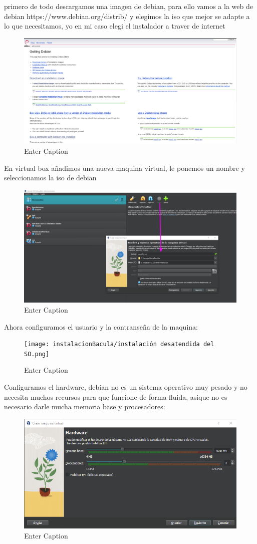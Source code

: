 primero de todo descargamos una imagen de debian, para ello vamos a la web de debian https://www.debian.org/distrib/ y elegimos la iso que mejor se adapte a lo que necesitamos, yo en mi caso elegi el instalador a traver de internet
\begin{figure}[H]
    \centering
    \includegraphics[width=0.5\linewidth]{instalacionBacula/debianPaginaWeb.png}
    \caption{Enter Caption}
\end{figure}
En virtual box añadimos una nueva maquina virtual, le ponemos un nombre y seleccionamos la iso de debian
\begin{figure}[H]
    \centering
    \includegraphics[width=0.5\linewidth]{instalacionBacula/vbDebian.png}
    \caption{Enter Caption}
\end{figure}


Ahora configuramos el usuario y la contranseña de la maquina:

\begin{figure}[H]
    \centering
    \texttt{[image: instalacionBacula/instalación desatendida del SO.png]}
    \caption{Enter Caption}
\end{figure}

Configuramos el hardware, debian no es un sistema operativo muy pesado y no necesita muchos recursos para que funcione de forma fluida, asique no es necesario darle mucha memoria base y procesadores:
\begin{figure}[H]
    \centering
    \includegraphics[width=0.5\linewidth]{instalacionBacula/vbhardware.png}
    \caption{Enter Caption}
\end{figure}


